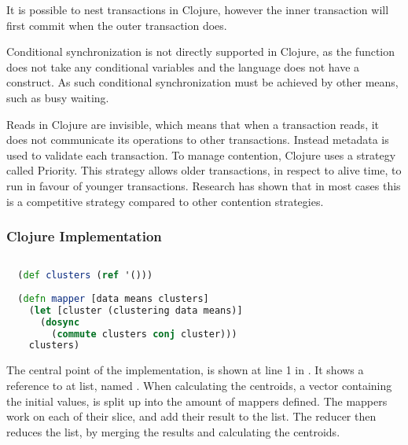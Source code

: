 It is possible to nest transactions in Clojure, however the inner transaction will first commit when the outer transaction does.

Conditional synchronization is not directly supported in Clojure, as the  function does not take any conditional variables and the language does not have a  construct. As such conditional synchronization must be achieved by other means, such as busy waiting.

Reads in Clojure are invisible\cite{nielsen2010benchmarking}, which means that when a transaction reads, it does not communicate its operations to other transactions. Instead metadata is used to validate each transaction. To manage contention, Clojure uses a strategy called Priority\cite{nielsen2010benchmarking}. This strategy allows older transactions, in respect to alive time, to run in favour of younger transactions. Research\cite{nielsen2010benchmarking} has shown that in most cases this is a competitive strategy compared to other contention strategies. 

\subsubsection{Clojure Implementation}
\begin{lstlisting}[float,label=lst:stm_implementation,
  caption={\ac{STM} Implementation},
  language=clojure,  
  showspaces=false,
  showtabs=false,
  breaklines=true,
  showstringspaces=false,
  breakatwhitespace=true,
  commentstyle=\color{greencomments},
  keywordstyle=\color{bluekeywords},
  stringstyle=\color{redstrings}]  % Start your code-block
  
  (def clusters (ref '()))
    
  (defn mapper [data means clusters]
    (let [cluster (clustering data means)]
      (dosync
        (commute clusters conj cluster)))
    clusters)
\end{lstlisting}

The central point of the implementation, is shown at line 1 in . It shows a reference to at list, named . When calculating the centroids, a vector containing the initial values, is split up into the amount of mappers defined. The mappers work on each of their slice, and add their result to the  list. The reducer then reduces the list, by merging the results and calculating the centroids.

